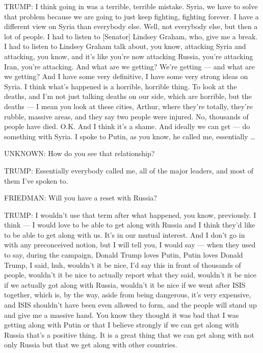 TRUMP: I think going in was a terrible, terrible mistake. Syria, we have
to solve that problem because we are going to just keep fighting,
fighting forever. I have a different view on Syria than everybody else.
Well, not everybody else, but then a lot of people. I had to listen to
{[}Senator{]} Lindsey Graham, who, give me a break. I had to listen to
Lindsey Graham talk about, you know, attacking Syria and attacking, you
know, and it's like you're now attacking Russia, you're attacking Iran,
you're attacking. And what are we getting? We're getting --- and what
are we getting? And I have some very definitive, I have some very strong
ideas on Syria. I think what's happened is a horrible, horrible thing.
To look at the deaths, and I'm not just talking deaths on our side,
which are horrible, but the deaths --- I mean you look at these cities,
Arthur, where they're totally, they're rubble, massive areas, and they
say two people were injured. No, thousands of people have died. O.K. And
I think it's a shame. And ideally we can get --- do something with
Syria. I spoke to Putin, as you know, he called me, essentially \ldots{}

UNKNOWN: How do you see that relationship?

TRUMP: Essentially everybody called me, all of the major leaders, and
most of them I've spoken to.

FRIEDMAN: Will you have a reset with Russia?

TRUMP: I wouldn't use that term after what happened, you know,
previously. I think --- I would love to be able to get along with Russia
and I think they'd like to be able to get along with us. It's in our
mutual interest. And I don't go in with any preconceived notion, but I
will tell you, I would say --- when they used to say, during the
campaign, Donald Trump loves Putin, Putin loves Donald Trump, I said,
huh, wouldn't it be nice, I'd say this in front of thousands of people,
wouldn't it be nice to actually report what they said, wouldn't it be
nice if we actually got along with Russia, wouldn't it be nice if we
went after ISIS together, which is, by the way, aside from being
dangerous, it's very expensive, and ISIS shouldn't have been even
allowed to form, and the people will stand up and give me a massive
hand. You know they thought it was bad that I was getting along with
Putin or that I believe strongly if we can get along with Russia that's
a positive thing. It is a great thing that we can get along with not
only Russia but that we get along with other countries.

